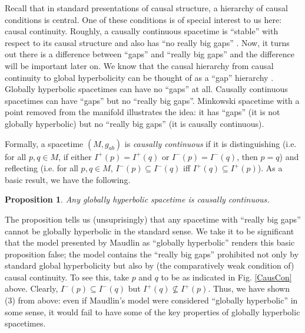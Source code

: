 \documentclass[authoryear,12pt,3p]{jowarticle}
\newtheorem{prop}[thm]{Proposition}
\begin{document}
Recall that in standard presentations of causal structure, a hierarchy of causal conditions is central. One of these conditions is of special interest to us here: causal continuity. Roughly, a causally continuous spacetime is ``stable'' with respect to its causal structure and also has ``no really big gaps'' \citep[p. 288]{Hawking+Sachs}. Now, it turns out there is a difference between ``gaps'' and ``really big gaps'' and the difference will be important later on. We know that the causal hierarchy from causal continuity to global hyperbolicity can be thought of as a ``gap'' hierarchy \citep[p. 295]{Hawking+Sachs}. Globally hyperbolic spacetimes can have no ``gaps'' at all. Causally continuous spacetimes can have ``gaps'' but no ``really big gaps''. Minkowski spacetime with a point removed from the manifold illustrates the idea: it has ``gaps'' (it is not globally hyperbolic) but no ``really big gaps'' (it is causally continuous).

Formally, a spacetime $(M, g_{ab})$ is {\em causally continuous} if it is distinguishing (i.e. for all $p, q \in M$, if either $I^+(p)=I^+(q)$ or $I^-(p)=I^-(q)$, then $p=q$) and reflecting (i.e. for all $p, q \in M$, $I^-(p) \subseteq I^-(q)$ iff $I^+(q) \subseteq I^+(p)$). As a basic result, we have the following. \\

\begin{prop} Any globally hyperbolic spacetime is causally continuous. \end{prop}

The proposition tells us (unsuprisingly) that any spacetime with ``really big gaps'' cannot be globally hyperbolic in the standard sense. We take it to be significant that the model presented by Maudlin as ``globally hyperbolic'' renders this basic proposition false; the model contains the ``really big gaps'' prohibited not only by standard global hyperbolicity but also by (the comparatively weak condition of) causal continuity. To see this, take $p$ and $q$ to be as indicated in Fig. \ref{CausCon} above. Clearly, $I^-(p) \subseteq I^-(q)$ but $I^+(q) \nsubseteq I^+(p)$. Thus, we have shown (3) from above: even if Maudlin's model were considered ``globally hyperbolic'' in some sense, it would fail to have some of the key properties of globally hyperbolic spacetimes.
\end{document}
